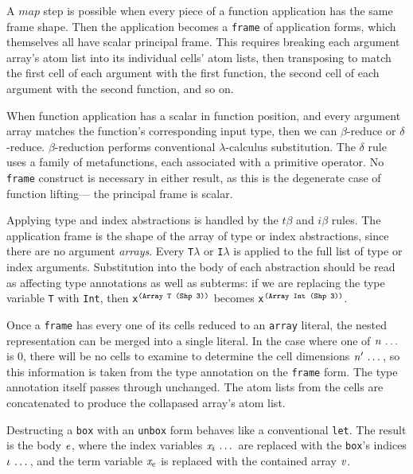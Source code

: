 A $\mathit{map}$ step is possible when
every piece of a function application has the same frame shape.
Then the application becomes a {\tt frame} of application forms,
which themselves all have scalar principal frame.
This requires breaking each argument array's atom list
into its individual cells' atom lists,
then transposing to match the first cell of each argument with the first function,
the second cell of each argument with the second function,
and so on.

When function application has a scalar in function position,
and every argument array matches the function's corresponding input type,
then we can $\beta$-reduce or $\delta$-reduce.
$\beta$-reduction performs conventional $\lambda$-calculus substitution.
The $\delta$ rule uses a family of metafunctions,
each associated with a primitive operator.
No {\tt frame} construct is necessary in either result,
as this is the degenerate case of function lifting---%
the principal frame is scalar.

Applying type and index abstractions is handled by
the $\mathit{t\beta}$ and $\mathit{i\beta}$ rules.
The application frame is the shape of the array of type or index abstractions,
since there are no argument \emph{arrays}.
Every {\tt T$\lambda$} or {\tt I$\lambda$} is applied to
the full list of type or index arguments.
Substitution into the body of each abstraction
should be read as affecting type annotations as well as subterms:
if we are replacing the type variable {\tt T} with {\tt Int},
then {\tt x$^{\text{\tt (Array T (Shp 3))}}$} becomes {\tt x$^{\text{\tt (Array Int (Shp 3))}}$}.

Once a {\tt frame} has every one of its cells reduced to an {\tt array} literal,
the nested representation can be merged into a single literal.
In the case where one of $\mathit{n} \, \ldots \,$ is 0,
there will be no cells to examine to determine the cell dimensions $\mathit{n}' \, \ldots \,$,
so this information is taken from the type annotation on the {\tt frame} form.
The type annotation itself passes through unchanged.
The atom lists from the cells are concatenated
to produce the collapased array's atom list.

Destructing a {\tt box} with an {\tt unbox} form
behaves like a conventional {\tt let}.
The result is the body $\mathit{e}$,
where the index variables $\mathit{x}_i \, \ldots \,$
are replaced with the {\tt box}'s indices $\mathit{\iota} \, \ldots \,$,
and the term variable $\mathit{x}_e$ is replaced with the contained array $\mathit{v}$.

\FigDynamicSemantics


